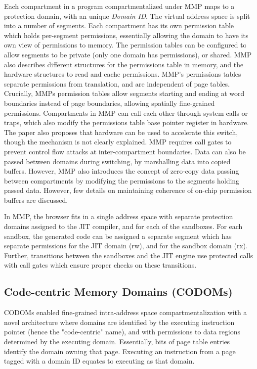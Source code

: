 Each compartment in a program compartmentalized under MMP maps to a protection
domain, with an unique \emph{Domain ID}.
The virtual address space is split into a number of segments.
Each compartment has its own permission table which holds per-segment permissions,
essentially allowing the domain to have its own view of permissions to memory.
The permission tables can be configured to allow segments to be private (only one 
domain has permissions), or shared.
MMP also describes different structures for the permissions table in memory, and
the hardware structures to read and cache permissions.
MMP's permissions tables separate permissions from translation, and are
independent of page tables.
Crucially, MMPs permission tables allow segments starting and ending at
word boundaries instead of page boundaries, allowing spatially fine-grained
permissions.
Compartments in MMP can call each other through system calls or traps, 
which also modify the permissions table base pointer register in hardware.
The paper also proposes that hardware can be used to accelerate this switch,
though the mechanism is not clearly explained.
MMP requires call gates to prevent control flow attacks at inter-compartment
boundaries.
Data can also be passed between domains during switching, by marshalling
data into copied buffers.
However, MMP also introduces the concept of zero-copy data passing between
compartments by modifying the permissions to the segments holding passed data.
However, few details on maintaining coherence of on-chip permission buffers 
are discussed.

In MMP, the browser fits in a single address space with separate protection 
domains assigned to the JIT compiler, and for each of the sandboxes.
For each sandbox, the generated code can be assigned a separate segment
which has separate permissions for the JIT domain (rw), and for the sandbox
domain (rx).
Further, transitions between the sandboxes and the JIT engine use protected
calls with call gates which ensure proper checks on these transitions.

\subsection{Code-centric Memory Domains (CODOMs)}
CODOMs enabled fine-grained intra-address space compartmentalization
with a novel architecture where domains are identified by the executing
instruction pointer (hence the "code-centric" name), and with permissions
to data regions determined by the executing domain. 
Essentially, bits of page table entries identify the domain owning that
page.
Executing an instruction from a page tagged with a domain ID equates to
executing as that domain.

